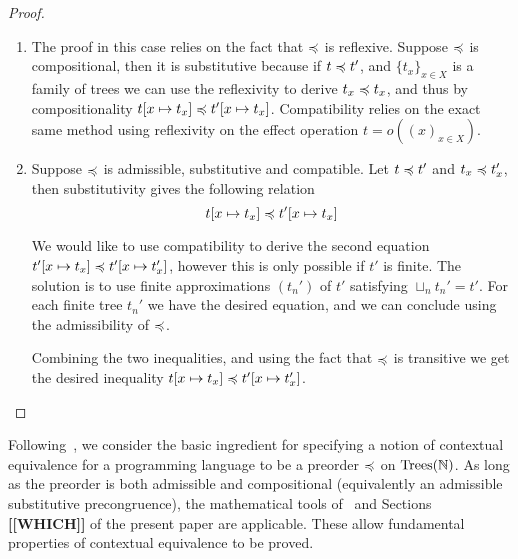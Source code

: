 \noindent
{}
\begin{proof}
    \begin{enumerate}
        \item 
            The proof in this case relies on the fact that $\preccurlyeq$ is reflexive.
            Suppose $\preccurlyeq$ is compositional, then 
            it is substitutive because if $t \preccurlyeq t'$, and $\{ t_x \}_{x
            \in X}$ is a family of trees we can use the reflexivity to derive 
            $t_x \preccurlyeq t_x$, and thus 
            by compositionality $t[ x \mapsto t_x] \preccurlyeq t'[x \mapsto t_x]$.
            Compatibility relies on the exact same method using reflexivity on 
            the effect operation $t = o((x)_{x \in X})$.

        \item 
            Suppose $\preccurlyeq$ is admissible, substitutive and compatible. 
            Let $t \preccurlyeq t'$ and $t_x \preccurlyeq t_x'$, then substitutivity 
            gives the following relation 
            \begin{equation}
                t[x \mapsto t_x] \preccurlyeq t'[x \mapsto t_x]
            \end{equation}

            We would like to use compatibility to derive 
            the second equation $t'[x \mapsto t_x] \preccurlyeq t'[x \mapsto
            t_x']$, however this is only possible if $t'$ is finite. 
            The solution is to use finite approximations $(t_n')$ of $t'$
            satisfying $\sqcup_n t_n' = t'$. For each finite tree $t_n'$
            we have the desired equation, and we can conclude using 
            the admissibility of $\preccurlyeq$.

            Combining the two inequalities, and using the fact that 
            $\preccurlyeq$ is transitive we get the desired inequality
            $t[x \mapsto t_x] \preccurlyeq t'[x \mapsto t_x']$.
    \end{enumerate}
\end{proof}



\todo[inline]{[[MOTIVATE]]}
Following~\cite{gom}, we consider the basic ingredient for specifying  a notion of
contextual equivalence for a programming language to be a preorder $\preccurlyeq$ on $\textnormal{Trees}(\mathbb{N})$.
As long as the preorder is both admissible and compositional (equivalently an
admissible substitutive precongruence), the mathematical tools of~\cite{gom} and
Sections \textbf{[[WHICH]]} of the present paper are applicable. These allow fundamental properties of contextual equivalence to be proved.

